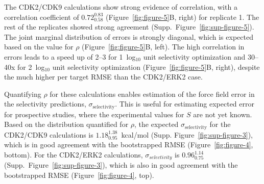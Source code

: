 \documentclass[phd,tocprelim]{cornell}
\begin{document}
The CDK2/CDK9 calculations show strong evidence of correlation, with a correlation coefficient of $0.72^{0.83}_{0.58}$ (Figure~\ref{fig:figure-5}B, right) for replicate 1. 
The rest of the replicates showed strong agreement (Supp.\ Figure~\ref{fig:sup-figure-5}). The joint marginal distribution of errors is strongly diagonal, which is expected based on the value for $\rho$ (Figure~\ref{fig:figure-5}B, left). 
The high correlation in errors leads to a speed up of 2--3 for 1~log$_{10}$ unit selectivity optimization and 30--40x for 2~log$_{10}$ unit selectivity optimization (Figure~\ref{fig:figure-5}B, right), despite the much higher per target RMSE than the CDK2/ERK2 case. 

Quantifying $\rho$ for these calculations enables estimation of the force field error in the selectivity predictions, $\sigma_\text{selectivity}$. 
This is useful for estimating expected error for prospective studies, where the experimental values for $S$ are not yet known. Based on the distribution quantified for $\rho$, the expected $\sigma_\text{selectivity}$ for the CDK2/CDK9 calculations is $1.18^{1.38}_{0.95}$~kcal/mol (Supp. Figure~\ref{fig:sup-figure-3}), which is in good agreement with the bootstrapped RMSE (Figure~\ref{fig:figure-4}, bottom). 
For the CDK2/ERK2 calculations, $\sigma_{selectivity}$ is $0.96^{1.14}_{0.75}$ (Supp.\ Figure~\ref{fig:sup-figure-3}), which is also in good agreement with the bootstrapped RMSE (Figure~\ref{fig:figure-4}, top). 
\end{document}
